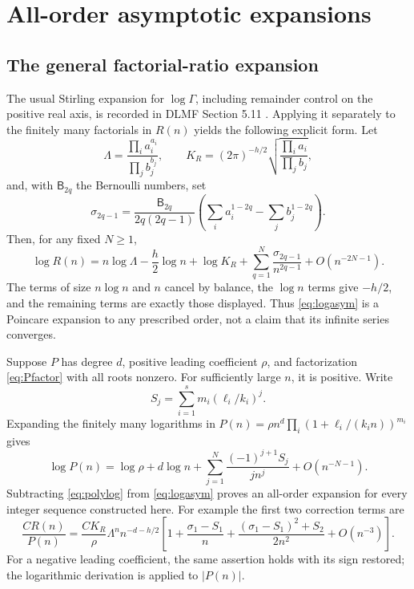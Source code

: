 \documentclass[11pt]{article}
\theoremstyle{definition}
\theoremstyle{remark}
\begin{document}
\section{All-order asymptotic expansions}
\subsection{The general factorial-ratio expansion}
The usual Stirling expansion for $\log\Gamma$, including remainder
control on the positive real axis, is recorded in DLMF Section 5.11
\cite{dlmf}. Applying it separately to the finitely many factorials
in $R(n)$ yields the following explicit form. Let
\[
 \Lambda=\frac{\prod_i a_i^{a_i}}{\prod_j b_j^{b_j}},\qquad
 K_R=(2\pi)^{-h/2}
       \sqrt{\frac{\prod_i a_i}{\prod_j b_j}},
\]
and, with $\mathsf B_{2q}$ the Bernoulli numbers, set
\begin{equation}\label{eq:sigma}
 \sigma_{2q-1}=
 \frac{\mathsf B_{2q}}{2q(2q-1)}
 \left(\sum_i a_i^{1-2q}-\sum_j b_j^{1-2q}\right).
\end{equation}
Then, for any fixed $N\geq1$,
\begin{equation}\label{eq:logasym}
 \log R(n)=n\log\Lambda-\frac h2\log n+\log K_R
 +\sum_{q=1}^{N}\frac{\sigma_{2q-1}}{n^{2q-1}}
 +O(n^{-2N-1}).
\end{equation}
The terms of size $n\log n$ and $n$ cancel by balance, the $\log n$
terms give $-h/2$, and the remaining terms are exactly those displayed.
Thus \eqref{eq:logasym} is a Poincare expansion to any prescribed order,
not a claim that its infinite series converges.

Suppose $P$ has degree $d$, positive leading coefficient $\rho$, and
factorization \eqref{eq:Pfactor} with all roots nonzero. For sufficiently
large $n$, it is positive. Write
\[
 S_j=\sum_{i=1}^s m_i(\ell_i/k_i)^j.
\]
Expanding the finitely many logarithms in
$P(n)=\rho n^d\prod_i(1+\ell_i/(k_i n))^{m_i}$ gives
\begin{equation}\label{eq:polylog}
 \log P(n)=\log\rho+d\log n
 +\sum_{j=1}^N\frac{(-1)^{j+1}S_j}{j n^j}
 +O(n^{-N-1}).
\end{equation}
Subtracting \eqref{eq:polylog} from \eqref{eq:logasym} proves an
all-order expansion for every integer sequence constructed here.
For example the first two correction terms are
\begin{equation}\label{eq:genericfirst}
 \frac{CR(n)}{P(n)}
 =\frac{CK_R}{\rho}\Lambda^n n^{-d-h/2}
 \left[1+\frac{\sigma_1-S_1}{n}
 +\frac{(\sigma_1-S_1)^2+S_2}{2n^2}+O(n^{-3})\right].
\end{equation}
For a negative leading coefficient, the same assertion holds with its
sign restored; the logarithmic derivation is applied to $|P(n)|$.
\end{document}

